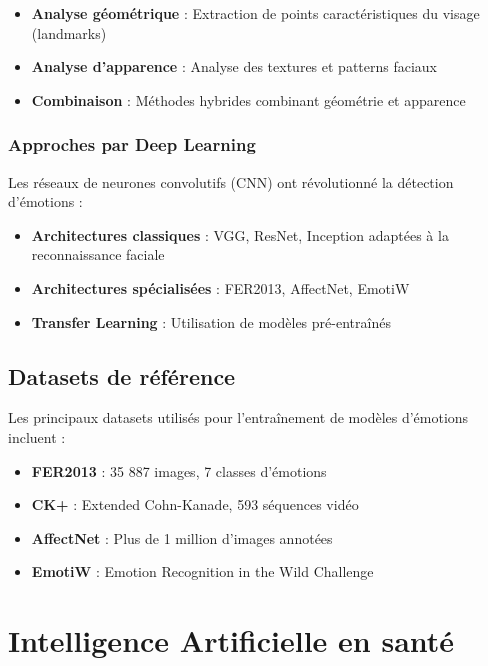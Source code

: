 \documentclass[a4paper,11pt]{report}
\begin{document}
\begin{itemize}
    \item \textbf{Analyse géométrique} : Extraction de points caractéristiques du visage (landmarks)
    \item \textbf{Analyse d'apparence} : Analyse des textures et patterns faciaux
    \item \textbf{Combinaison} : Méthodes hybrides combinant géométrie et apparence
\end{itemize}

\subsubsection{Approches par Deep Learning}

Les réseaux de neurones convolutifs (CNN) ont révolutionné la détection d'émotions :

\begin{itemize}
    \item \textbf{Architectures classiques} : VGG, ResNet, Inception adaptées à la reconnaissance faciale
    \item \textbf{Architectures spécialisées} : FER2013, AffectNet, EmotiW
    \item \textbf{Transfer Learning} : Utilisation de modèles pré-entraînés
\end{itemize}

\subsection{Datasets de référence}

Les principaux datasets utilisés pour l'entraînement de modèles d'émotions incluent :

\begin{itemize}
    \item \textbf{FER2013} : 35 887 images, 7 classes d'émotions
    \item \textbf{CK+} : Extended Cohn-Kanade, 593 séquences vidéo
    \item \textbf{AffectNet} : Plus de 1 million d'images annotées
    \item \textbf{EmotiW} : Emotion Recognition in the Wild Challenge
\end{itemize}

\section{Intelligence Artificielle en santé}
\end{document}
